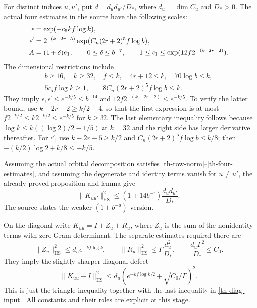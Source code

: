 For distinct indices $u,u'$, put
$d=d_ud_{u'}/D_*$, where $d_u=\dim C_u$ and $D_*>0$.
The actual four estimates in the source have the following scales:
\begin{align}\label{th-global-scales}
 \epsilon&=\exp(-c_5kf\log k),\notag\\
 \epsilon'&=2^{-(k-2r-5)}
       \exp\bigl(C_n(2r+2)^5f\log b\bigr),\notag\\
 A&=(1+\delta)e_1,\qquad
 0\le\delta\le b^{-7},\qquad
 1\le e_1\le\exp(12f2^{-(k-2r-2)}).
\end{align}
The dimensional restrictions include
\begin{equation}\label{th-global-parameters}
 \begin{gathered}
 b\ge16,\quad k\ge32,\quad f\le k,\quad 4r+12\le k,
 \quad70\log b\le k,\\
 5c_5f\log k\ge1,\qquad
 8C_n(2r+2)^5f\log b\le k.
 \end{gathered}
\end{equation}
They imply $\epsilon,\epsilon'\le e^{-k/5}\le b^{-14}$ and
$12f2^{-(k-2r-2)}\le e^{-k/5}$.  To verify the latter bound, use
$k-2r-2\ge k/2+4$, so that the first expression is at most
$f2^{-k/2}\le k2^{-k/2}\le e^{-k/5}$ for $k\ge32$.
The last elementary inequality follows because
$\log k\le k((\log2)/2-1/5)$ at $k=32$ and the right side has
larger derivative thereafter.  For $\epsilon'$, use
$k-2r-5\ge k/2$ and
$C_n(2r+2)^5f\log b\le k/8$; then
$-(k/2)\log2+k/8\le-k/5$.

Assuming the actual orbital decomposition satisfies
\eqref{th-row-norm}--\eqref{th-four-estimates}, and assuming the
degenerate and identity terms vanish for $u\ne u'$, the already
proved proposition and lemma give
\begin{equation}\label{th-off-final}
 \|K_{uu'}\|_{\mathrm{HS}}^2
 \le(1+14b^{-7})\frac{d_ud_{u'}}{D_*}.
\end{equation}
The source states the weaker $(1+b^{-6})$ version.

On the diagonal write $K_{uu}=I+Z_u+R_u$, where $Z_u$ is the sum
of the nonidentity terms with zero Gram determinant.  The separate
estimates required there are
\begin{equation}\label{th-diag-input}
 \|Z_u\|_{\mathrm{HS}}^2\le d_u e^{-kf\log k},\qquad
 \|R_u\|_{\mathrm{HS}}^2\le\Gamma\frac{d_u^2}{D_*},
 \qquad \frac{d_u\Gamma^2}{D_*}\le C_0.
\end{equation}
They imply the slightly sharper diagonal defect
\begin{equation}\label{th-diag-final}
 \|K_{uu}-I\|_{\mathrm{HS}}^2
 \le d_u\left(e^{-kf\log k/2}+\sqrt{C_0/\Gamma}\right)^2.
\end{equation}
This is just the triangle inequality together with the last
inequality in \eqref{th-diag-input}.  All constants and their roles
are explicit at this stage.

